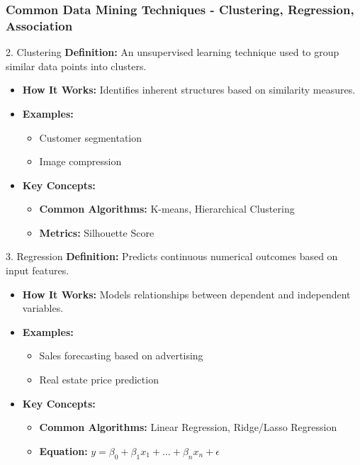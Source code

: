 \documentclass[aspectratio=169]{beamer}
\begin{document}
\begin{frame}[fragile]
    \frametitle{Common Data Mining Techniques - Clustering, Regression, Association}
    \begin{block}{2. Clustering}
        \textbf{Definition:} An unsupervised learning technique used to group similar data points into clusters.
    \end{block}
    \begin{itemize}
        \item \textbf{How It Works:} Identifies inherent structures based on similarity measures.
        \item \textbf{Examples:}
        \begin{itemize}
            \item Customer segmentation
            \item Image compression
        \end{itemize}
        \item \textbf{Key Concepts:}
        \begin{itemize}
            \item \textbf{Common Algorithms:} K-means, Hierarchical Clustering
            \item \textbf{Metrics:} Silhouette Score
        \end{itemize}
    \end{itemize}
    
    \begin{block}{3. Regression}
        \textbf{Definition:} Predicts continuous numerical outcomes based on input features.
    \end{block}
    \begin{itemize}
        \item \textbf{How It Works:} Models relationships between dependent and independent variables.
        \item \textbf{Examples:}
        \begin{itemize}
            \item Sales forecasting based on advertising
            \item Real estate price prediction
        \end{itemize}
        \item \textbf{Key Concepts:}
        \begin{itemize}
            \item \textbf{Common Algorithms:} Linear Regression, Ridge/Lasso Regression
            \item \textbf{Equation:} \( y = \beta_0 + \beta_1x_1 + ... + \beta_nx_n + \epsilon \)
        \end{itemize}
    \end{itemize}
    

\end{frame}
\end{document}
